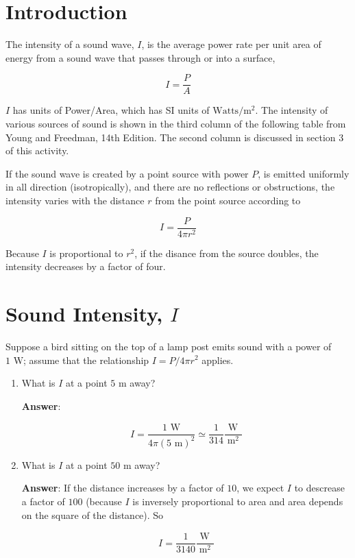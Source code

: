 \documentclass{article}
\begin{document}
\section{Introduction}

The intensity of a sound wave, $I$, is the average power rate per unit area of energy from a sound wave that passes through or into a surface,

$$I = \frac{P}{A}$$

$I$ has units of Power/Area, which has SI units of $\text{Watts}/\text{m}^2$. The intensity of various sources of sound is shown in the third column of the following table from Young and Freedman, 14th Edition. The second column is discussed in section 3 of this activity.



If the sound wave is created by a point source with power $P$, is emitted uniformly in all direction (isotropically), and there are no reflections or obstructions, the intensity varies with the distance $r$ from the point source according to

$$I = \frac{P}{4\pi r^2}$$

Because $I$ is proportional to $r^2$, if the disance from the source doubles, the intensity decreases by a factor of four.

\newpage

\section{Sound Intensity, $I$}

Suppose a bird sitting on the top of a lamp post emits sound with a power of $1\text{ W}$; assume that the relationship $I = P/4\pi r^2$ applies.

\begin{enumerate}

  \item What is $I$ at a point $5\text{ m}$ away?

        \ifsolutions
        \textbf{Answer}:

        $$I = \frac{1\text{ W}}{4\pi (5\text{ m})^2} \simeq \frac{1}{314} \frac{\text{ W}\phantom{^2}}{\text{m}^2}$$
        \else
        \vskip 120pt
        \fi

  \item What is $I$ at a point $50\text{ m}$ away?

        \ifsolutions
        \textbf{Answer}: If the distance increases by a factor of $10$, we expect $I$ to descrease a factor of $100$ (because $I$ is inversely proportional to area and area depends on the square of the distance). So

        $$I = \frac{1}{3140} \frac{\text{ W}\phantom{^2}}{\text{m}^2}$$
        \else
        \vskip 120pt
        \fi

\end{enumerate}
\end{document}
